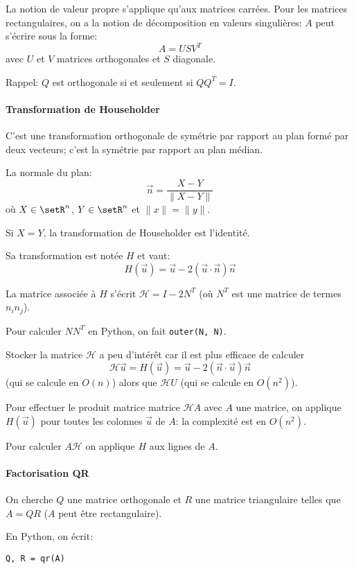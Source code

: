 \documentclass[a4paper,10pt,french,openany]{memoir}
\newcommand{\norm}[1]{\lVert#1\rVert}
\begin{document}
La notion de valeur propre s'applique qu'aux matrices carrées. Pour les matrices rectangulaires, on a la notion de décomposition en valeurs singulières: $A$ peut s'écrire sous la forme:
\[ A = U S V^{T} \]
avec $U$ et $V$ matrices orthogonales et $S$ diagonale.

Rappel: $Q$ est orthogonale si et seulement si $Q Q^T = I$.

\paragraph{Transformation de Householder}
C'est une transformation orthogonale de symétrie par rapport au plan formé par deux vecteurs; c'est la symétrie par rapport au plan médian.

La normale du plan: \[\overrightarrow{n} = \frac{X-Y}{\norm{X-Y}}\] où $X \in \setR^n$, $Y \in \setR^n$ et $\norm x = \norm y$.

Si $X = Y$, la transformation de Householder est l'identité.

Sa transformation est notée $H$ et vaut:
\[ H(\overrightarrow{u}) = \overrightarrow{u} - 2 (\overrightarrow{u} \cdot \overrightarrow{n}) \overrightarrow{n} \]

La matrice associée à $H$ s'écrit $\mathcal{H} = I - 2 N^T$ (où $N^T$ est une matrice de termes $n_i n_j$).

Pour calculer $N N^T$ en Python, on fait \lstinline{outer(N, N)}.

Stocker la matrice $\mathcal{H}$ a peu d'intérêt car il est plus efficace de calculer \[ \mathcal{H} \overrightarrow{u} = H(\overrightarrow u) = \overrightarrow{u} - 2 (\overrightarrow{n} \cdot \overrightarrow{u}) \overrightarrow{n} \] (qui se calcule en $O(n)$) alors que $\mathcal H U$ (qui se calcule en $O(n^2)$).

Pour effectuer le produit matrice matrice $\mathcal H A$ avec $A$ une matrice, on applique $H(\overrightarrow u)$ pour toutes les colonnes $\overrightarrow u$ de $A$: la complexité est en $O(n^2)$.

Pour calculer $A \mathcal H$ on applique $H$ aux lignes de $A$.

\paragraph{Factorisation QR}
On cherche $Q$ une matrice orthogonale et $R$ une matrice triangulaire telles que $A = Q R$ ($A$ peut être rectangulaire).

En Python, on écrit:
\begin{lstlisting}
Q, R = qr(A)
\end{lstlisting}
\end{document}

